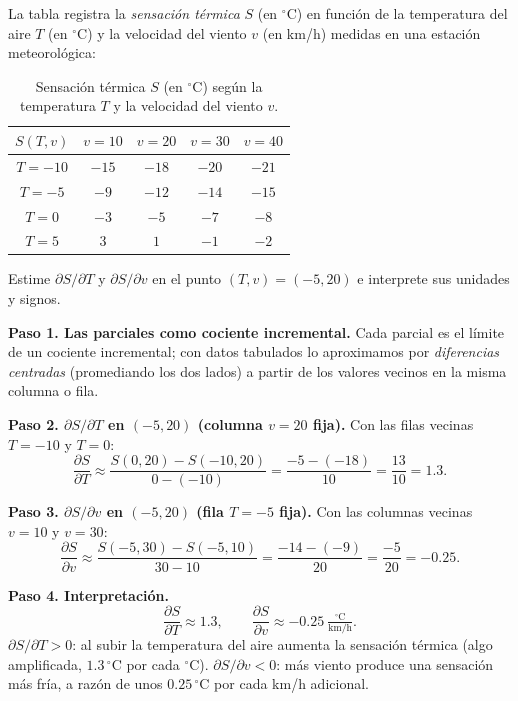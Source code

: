 \begin{example}
La tabla registra la \emph{sensación térmica} $S$ (en $^\circ$C) en función de
la temperatura del aire $T$ (en $^\circ$C) y la velocidad del viento $v$ (en
km/h) medidas en una estación meteorológica:
\begin{table}[H]
\centering
\begin{tabular}{c|cccc}
$S(T,v)$ & $v=10$ & $v=20$ & $v=30$ & $v=40$ \\ \hline
$T=-10$  & $-15$  & $-18$  & $-20$  & $-21$  \\
$T=-5$   & $-9$   & $-12$  & $-14$  & $-15$  \\
$T=0$    & $-3$   & $-5$   & $-7$   & $-8$   \\
$T=5$    & $3$    & $1$    & $-1$   & $-2$   \\
\end{tabular}
\caption{Sensación térmica $S$ (en $^\circ$C) según la temperatura $T$ y la velocidad del viento $v$.}
\end{table}
Estime $\partial S/\partial T$ y $\partial S/\partial v$ en el punto
$(T,v)=(-5,20)$ e interprete sus unidades y signos.
\begin{myproof}
\textbf{Paso 1. Las parciales como cociente incremental.}
Cada parcial es el límite de un cociente incremental; con datos tabulados lo
aproximamos por \emph{diferencias centradas} (promediando los dos lados) a
partir de los valores vecinos en la misma columna o fila.

\textbf{Paso 2. $\partial S/\partial T$ en $(-5,20)$ (columna $v=20$ fija).}
Con las filas vecinas $T=-10$ y $T=0$:
\[
  \frac{\partial S}{\partial T}\approx
  \frac{S(0,20)-S(-10,20)}{0-(-10)}
  =\frac{-5-(-18)}{10}=\frac{13}{10}=1.3.
\]

\textbf{Paso 3. $\partial S/\partial v$ en $(-5,20)$ (fila $T=-5$ fija).}
Con las columnas vecinas $v=10$ y $v=30$:
\[
  \frac{\partial S}{\partial v}\approx
  \frac{S(-5,30)-S(-5,10)}{30-10}
  =\frac{-14-(-9)}{20}=\frac{-5}{20}=-0.25.
\]

\textbf{Paso 4. Interpretación.}
\[
  \boxed{\ \frac{\partial S}{\partial T}\approx 1.3,\qquad
  \frac{\partial S}{\partial v}\approx -0.25\ \tfrac{^\circ\text{C}}{\text{km/h}}.\ }
\]
$\partial S/\partial T>0$: al subir la temperatura del aire aumenta la
sensación térmica (algo amplificada, $1.3\,^\circ$C por cada $^\circ$C).
$\partial S/\partial v<0$: más viento produce una sensación más fría, a razón
de unos $0.25\,^\circ$C por cada km/h adicional.
\end{myproof}
\end{example}


